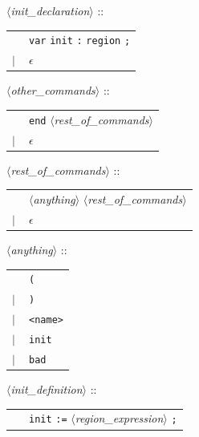 \documentclass[a4paper,11pt]{report}
\newcommand{\emptystring}{$\epsilon$}
\newcommand{\nt}[1]{$\langle$\emph{#1}$\rangle$}
\newcommand{\regleGrammaire}[1]{\bigskip \noindent \nt{#1} :: \\}
\newcommand{\npec}[1]{\textcolor{green!50!black}{#1}}
\newcommand{\styleIMI}[1]{\textcolor{imicolor}{\texttt{#1}}}
\begin{document}
\regleGrammaire{\npec{init\_declaration}}
\begin{tabular}{l l}
	\  & \npec{\styleIMI{var} \styleIMI{init} \styleIMI{:} \styleIMI{region} \styleIMI{;}} \\
	$|$ & \emptystring \\
\end{tabular}

\regleGrammaire{other\_commands}
\begin{tabular}{l l}
	\  & \styleIMI{end} \npec{\nt{rest\_of\_commands}} \\
	$|$ & \emptystring \\
\end{tabular}

\regleGrammaire{\npec{rest\_of\_commands}}
\begin{tabular}{l l}
	\  & \npec{\nt{anything}} \npec{\nt{rest\_of\_commands}} \\
	$|$ & \emptystring \\
\end{tabular}

\regleGrammaire{\npec{anything}}
\begin{tabular}{l l}
	\  & \styleIMI{(} \\
	$|$ & \styleIMI{)} \\
	$|$ & \styleIMI{<name>} \\
	$|$ & \styleIMI{init} \\
	$|$ & \styleIMI{bad} \\
\end{tabular}


\regleGrammaire{init\_definition}
\begin{tabular}{l l}
	\  & \styleIMI{init} \styleIMI{:=} \nt{region\_expression} \styleIMI{;} \\
\end{tabular}
\end{document}
